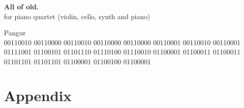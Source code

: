 \newcommand*{\titleTH}{\begingroup %
\raggedleft %
\vspace*{\baselineskip} %

{\LARGE\bfseries All of old.}\\[\baselineskip] %

{{\Huge for piano quartet (violin, cello, synth and piano)}}\\[\baselineskip] %

\vfill %

{\large Pangur \\ \small 00110010 00110000 00110010 00110000 00110000 00110001 00110010 00110001 01111001 01100101 01101110 01110100 01110010 01100001 01100011 01100011 01101101 01101101 01100001 01100100 01100001 }  %

\vspace*{3\baselineskip} %
\endgroup}


 


\frontmatter
\begin{titlepage}
\begin{center}
\pagestyle{plain} %
\titleTH %
\end{center}
\end{titlepage}

\mainmatter

\section{Appendix}
\begin{center}
\fancyhf{} %
\renewcommand{\headrulewidth}{0pt} %
\rfoot{\thepage}
\pagestyle{plain}
\begin{center}
 
    \clearpage\mbox{}\clearpage
\end{center}
\end{center}

